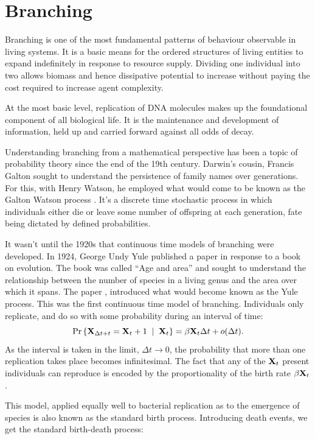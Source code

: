 \section{Branching}

Branching is one of the most fundamental patterns of behaviour observable in living systems. It is a basic means for the ordered structures of living entities to expand indefinitely in response to resource supply. Dividing one individual into two allows biomass and hence dissipative potential to increase without paying the cost required to increase agent complexity.\par

At the most basic level, replication of DNA molecules makes up the foundational component of all biological life. It is the maintenance and development of information, held up and carried forward against all odds of decay.\par

Understanding branching from a mathematical perspective has been a topic of probability theory since the end of the 19th century. Darwin's cousin, Francis Galton sought to understand the persistence of family names over generations. For this, with Henry Watson, he employed what would come to be known as the Galton Watson process  \cite{watson1875probability}. It's a discrete time stochastic process in which individuals either die or leave some number of offspring at each generation, fate being dictated by defined probabilities.\par 

It wasn't until the 1920s that continuous time models of branching were developed. In 1924, George Undy Yule published a paper in response to a book on evolution. The book was called ``Age and area'' and sought to understand the relationship between the number of species in a living genus and the area over which it spans. The paper  \cite{yule1925ii}, introduced what would become known as the Yule process. This was the first continuous time model of branching. Individuals only replicate, and do so with some probability during an interval of time:
$${\text{Pr}\left\{{\bf X}_{\Delta t + t}  = {{\bf X}_t} + 1 \;\; | \;\; {{\bf X}_t}\right\}} = \beta {{\bf X}_t} \Delta t + o(\Delta t).$$
As the interval is taken in the limit, $\Delta t\to 0$, the probability that more than one replication takes place becomes infinitesimal. The fact that any of the ${{\bf X}_t}$ present individuals can reproduce is encoded by the proportionality of the birth rate $\beta {{\bf X}_t}$.\par This model, applied equally well to bacterial replication as to the emergence of species is also known as the standard birth process. Introducing death events, we get the standard birth-death process:

